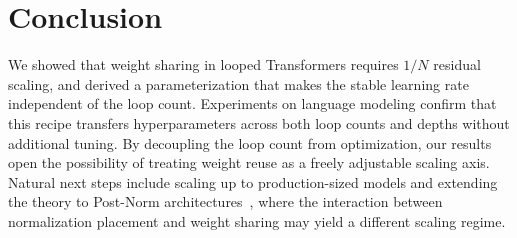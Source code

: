 \section{Conclusion}




We showed that weight sharing in looped Transformers requires $1/N$ residual scaling, and derived a parameterization that makes the stable learning rate independent of the loop count.
Experiments on language modeling confirm that this recipe transfers hyperparameters across both loop counts and depths without additional tuning.
By decoupling the loop count from optimization, our results open the possibility of treating weight reuse as a freely adjustable scaling axis.
Natural next steps include scaling up to production-sized models and extending the theory to Post-Norm architectures~\citep{DBLP:conf/icml/XiongYHZZXZLWL20}, where the interaction between normalization placement and weight sharing may yield a different scaling regime.

